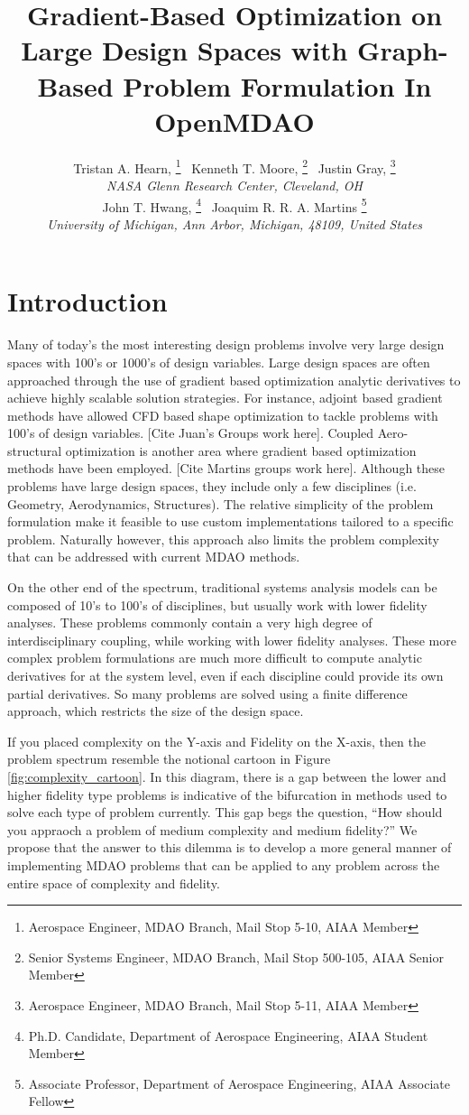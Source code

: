 \documentclass[]{aiaa-tc} %
\title{Gradient-Based Optimization on Large Design Spaces with Graph-Based Problem Formulation In OpenMDAO}
\author{
  Tristan A. Hearn,%
     \thanks{Aerospace Engineer, MDAO Branch, Mail Stop 5-10, AIAA Member}
  \ Kenneth T. Moore,%
     \thanks{Senior Systems Engineer, MDAO Branch, Mail Stop 500-105, AIAA Senior Member} 
  \ Justin Gray,%
     \thanks{Aerospace Engineer, MDAO Branch, Mail Stop 5-11, AIAA Member}
   \\
  {\normalsize\itshape
  NASA Glenn Research Center, Cleveland, OH}  \\
  John T. Hwang,%
  \thanks{Ph.D. Candidate, Department of Aerospace Engineering, AIAA Student Member}
  \ Joaquim R. R. A. Martins%
  \thanks{Associate Professor, Department of Aerospace Engineering, AIAA Associate Fellow}
  \\
  {\normalsize\itshape
   University of Michigan, Ann Arbor, Michigan, 48109, United States}
}
\begin{document}
  \maketitle
   
  \begin{abstract}

  \end{abstract}

  \section{Introduction}

    Many of today's the most interesting design problems involve very large design spaces with 100's or 1000's of 
    design variables. Large design spaces are often approached through the use of gradient based optimization 
    analytic derivatives to achieve highly scalable solution strategies. For instance, adjoint based gradient 
    methods have allowed CFD based shape optimization to tackle problems with 100's of design variables. [Cite Juan's Groups
    work here]. Coupled Aero-structural optimization is another area where gradient based optimization methods have 
    been employed. [Cite Martins groups work here]. Although these problems have large design spaces, 
    they include only a few disciplines (i.e. Geometry, Aerodynamics, Structures). The relative simplicity of 
    the problem formulation make it feasible to use custom implementations tailored to a specific problem. Naturally however, 
    this approach also limits the problem complexity that can be addressed with current MDAO methods. 

    On the other end of the spectrum, traditional systems analysis models can be composed of 10's to 100's of disciplines, 
    but usually work with lower fidelity analyses. These problems commonly contain a very high degree of interdisciplinary 
    coupling, while working with lower fidelity analyses. These more complex problem formulations are much more difficult to compute 
    analytic derivatives for at the system level, even if each discipline could provide its own partial derivatives. So many 
    problems are solved using a finite difference approach, which restricts the size of the design space. 

    If you placed complexity on the Y-axis and Fidelity on the X-axis, then the problem spectrum resemble the notional 
    cartoon in Figure \ref{fig:complexity_cartoon}. In this diagram, there is a gap between the lower and higher fidelity 
    type problems is indicative of the bifurcation in methods used to solve each type of problem currently. This gap begs the 
    question, ``How should you appraoch a problem of medium complexity and medium fidelity?'' We propose that the answer to this
    dilemma is to develop a more general manner of implementing MDAO problems that can be applied to any problem across the entire 
    space of complexity and fidelity.  
\end{document}
